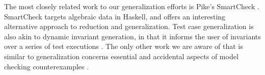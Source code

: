 The most closely related work to our generalization efforts is Pike's
SmartCheck \cite{SmartCheck}.  SmartCheck targets algebraic data in
Haskell, and offers an interesting alternative approach to reduction
and generalization.  Test case generalization is also akin to dynamic invariant generation,
in that it informs the user of invariants over a series of test
executions \cite{Daikon}.  The only other work we are aware of that is
similar to generalization concerns essential and accidental aspects of
model checking counterexamples \cite{FreeWill,MakeMost,SPIN03}.  